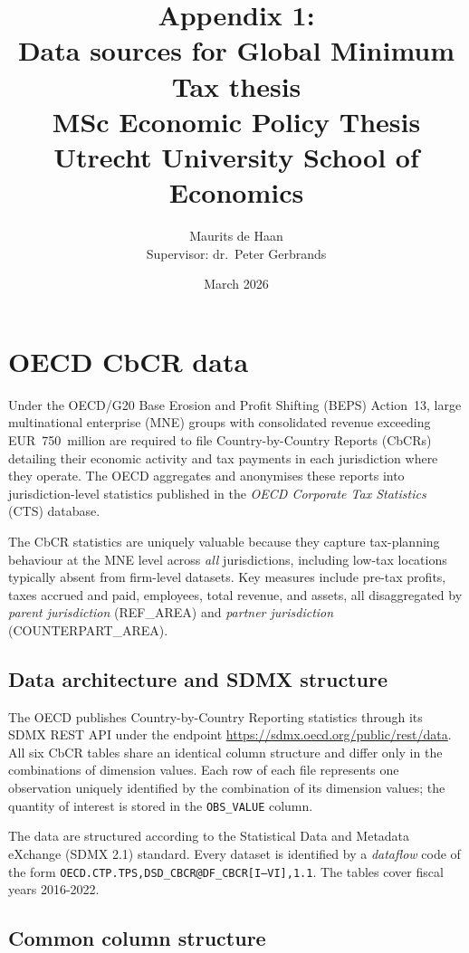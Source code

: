 \documentclass[11pt,a4paper]{article}
\title{\textbf{Appendix 1:\\  Data sources for Global Minimum Tax thesis}\\[0.5em]
\large MSc Economic Policy Thesis\\Utrecht University School of Economics}
\author{Maurits de Haan\\[0.3em]
\small Supervisor: dr.\ Peter Gerbrands}
\date{March 2026}
\newcommand{\code}[1]{\texttt{#1}}
\begin{document}
\maketitle

\newpage
\tableofcontents
\newpage

\section{OECD CbCR data}

Under the OECD/G20 Base Erosion and Profit Shifting (BEPS) Action~13, large multinational enterprise (MNE) groups with consolidated revenue exceeding EUR~750~million are required to file Country-by-Country Reports (CbCRs) detailing their economic activity and tax payments in each jurisdiction where they operate.  The OECD aggregates and anonymises these reports into jurisdiction-level statistics published in the \emph{OECD Corporate Tax Statistics} (CTS) database.

The CbCR statistics are uniquely valuable because they capture tax-planning behaviour at the MNE level across \emph{all} jurisdictions, including low-tax locations typically absent from firm-level datasets.  Key measures include pre-tax profits, taxes accrued and paid, employees, total revenue, and assets, all disaggregated by \emph{parent jurisdiction} (REF\_AREA) and \emph{partner jurisdiction} (COUNTERPART\_AREA).

\subsection{Data architecture and SDMX structure}\label{sec:architecture}

The OECD publishes Country-by-Country Reporting statistics through its SDMX REST API under the endpoint \url{https://sdmx.oecd.org/public/rest/data}. All six CbCR tables share an identical column structure and differ only in the combinations of dimension values. Each row of each file represents one observation uniquely identified by the combination of its dimension values; the quantity of interest is stored in the \code{OBS\_VALUE} column.

The data are structured according to the Statistical Data and Metadata eXchange (SDMX 2.1) standard. Every dataset is identified by a \emph{dataflow} code of the form \code{OECD.CTP.TPS,DSD\_CBCR@DF\_CBCR[I--VI],1.1}. The tables cover fiscal years 2016-2022.

\subsection{Common column structure}
\end{document}
